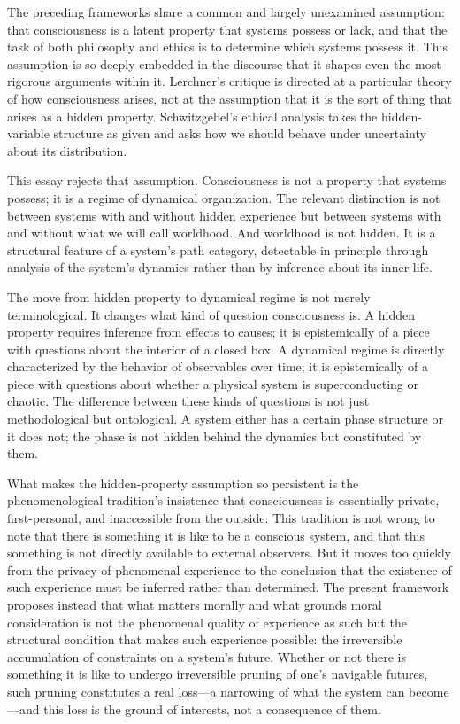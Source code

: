 \documentclass[11pt]{article}
\theoremstyle{definition}
\theoremstyle{remark}
\begin{document}
The preceding frameworks share a common and largely unexamined assumption: that consciousness
is a latent property that systems possess or lack, and that the task of both philosophy and
ethics is to determine which systems possess it. This assumption is so deeply embedded in
the discourse that it shapes even the most rigorous arguments within it. Lerchner's critique
is directed at a particular theory of how consciousness arises, not at the assumption that
it is the sort of thing that arises as a hidden property. Schwitzgebel's ethical analysis
takes the hidden-variable structure as given and asks how we should behave under uncertainty
about its distribution.

This essay rejects that assumption. Consciousness is not a property that systems possess;
it is a regime of dynamical organization. The relevant distinction is not between systems
with and without hidden experience but between systems with and without what we will call
worldhood. And worldhood is not hidden. It is a structural feature of a system's path
category, detectable in principle through analysis of the system's dynamics rather than by
inference about its inner life.

The move from hidden property to dynamical regime is not merely terminological. It changes
what kind of question consciousness is. A hidden property requires inference from effects
to causes; it is epistemically of a piece with questions about the interior of a closed box.
A dynamical regime is directly characterized by the behavior of observables over time; it
is epistemically of a piece with questions about whether a physical system is
superconducting or chaotic. The difference between these kinds of questions is not just
methodological but ontological. A system either has a certain phase structure or it does not;
the phase is not hidden behind the dynamics but constituted by them.

What makes the hidden-property assumption so persistent is the phenomenological tradition's
insistence that consciousness is essentially private, first-personal, and inaccessible from
the outside. This tradition is not wrong to note that there is something it is like to be
a conscious system, and that this something is not directly available to external observers.
But it moves too quickly from the privacy of phenomenal experience to the conclusion that
the existence of such experience must be inferred rather than determined. The present
framework proposes instead that what matters morally and what grounds moral consideration
is not the phenomenal quality of experience as such but the structural condition that makes
such experience possible: the irreversible accumulation of constraints on a system's future.
Whether or not there is something it is like to undergo irreversible pruning of one's
navigable futures, such pruning constitutes a real loss---a narrowing of what the system
can become---and this loss is the ground of interests, not a consequence of them.
\end{document}
